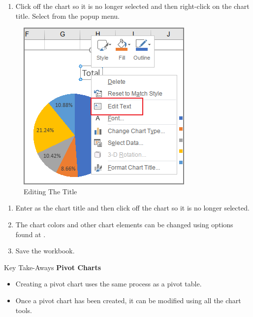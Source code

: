 \begin{enumerate}[resume]	
	\item Click off the chart so it is no longer selected and then right-click on the chart title. Select  from the popup menu.
\end{enumerate}

\begin{figure}[H]
	\centering
	\includegraphics[width=\maxwidth{.75\linewidth}]{gfx/ch07_fig32}
	\caption{Editing The Title}
	\label{07:fig32}
\end{figure}

\begin{enumerate}[resume]	
	\item Enter  as the chart title and then click off the chart so it is no longer selected.
	\item The chart colors and other chart elements can be changed using options found at .
	\item Save the  workbook.
	
\end{enumerate}

\begin{center}
	\begin{tkwbox}{Key Take-Aways}
		\textbf{Pivot Charts}
		\\
		\begin{itemize}
			\setlength{\itemsep}{0pt}
			\setlength{\parskip}{0pt}
			\setlength{\parsep}{0pt}
			
			\item Creating a pivot chart uses the same process as a pivot table.
			\item Once a pivot chart has been created, it can be modified using all the chart tools.
			
		\end{itemize}
	\end{tkwbox}
\end{center}

